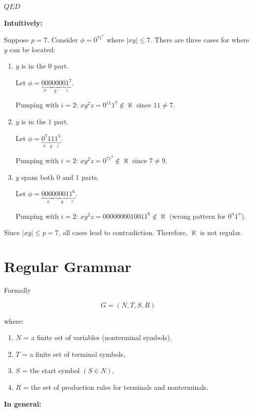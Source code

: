 \documentclass[12pt,a4paper,openany]{article}
\begin{document}
\hfill $QED$

\textbf{Intuitively:}

Suppose $p = 7$. Consider $\phi = 0^71^7$ where $|xy| \leq 7$. There are three cases for where $y$ can be located:

\begin{enumerate}
    \item $y$ is in the $0$ part.
    
    Let $\phi = \underbrace{00}_x \underbrace{0000}_y \underbrace{01^7}_z$.

    Pumping with $i = 2$: $xy^2z = 0^{11}1^7 \notin \aleph$ since $11 \neq 7$. 
    
    
    \item $y$ is in the $1$ part.
    
    Let $\phi = \underbrace{0^7}_x \underbrace{11}_y \underbrace{1^5}_z$.
    
    Pumping with $i = 2$: $xy^2z = 0^71^{9} \notin \aleph$ since $7 \neq 9$. 
    
    
    \item $y$ spans both $0$ and $1$ parts.
    
    Let $\phi = \underbrace{0000}_x \underbrace{0001}_y \underbrace{1^6}_z$.
    
    Pumping with $i = 2$: $xy^2z = 000000001001 1^6 \notin \aleph$ (wrong pattern for $0^n1^n$). 
\end{enumerate}

Since $|xy| \leq p = 7$, all cases lead to contradiction. Therefore, $\aleph$ is not regular.

\section{Regular Grammar}

Formally

\[
G = (N, T, S, R)
\]

where:

\begin{enumerate}
    \item $N$ = a finite set of variables (nonterminal symbols),
    \item $T$ = a finite set of terminal symbols,
    \item $S$ = the start symbol $(S \in N)$,
    \item $R$ = the set of production rules for terminals and nonterminals.
\end{enumerate}


\textbf{In general:}
\end{document}

